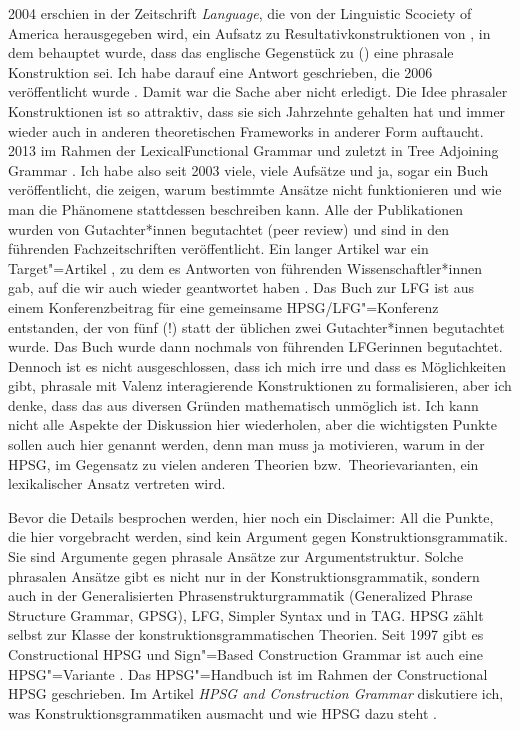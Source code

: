 2004 erschien in der Zeitschrift \emph{Language}, die von der Linguistic Scociety of America
herausgegeben wird, ein Aufsatz zu Resultativkonstruktionen von \citet{GJ2004a}, in dem behauptet
wurde, dass das englische Gegenstück zu () eine phrasale Konstruktion sei. Ich habe darauf
eine Antwort geschrieben, die 2006 veröffentlicht wurde \citep{Mueller2006d}. Damit war die Sache
aber nicht erledigt. Die Idee phrasaler Konstruktionen ist so attraktiv, dass sie sich Jahrzehnte
gehalten hat und immer wieder auch in anderen theoretischen Frameworks in anderer Form
auftaucht. 2013 im Rahmen der Lexical\indexlfg Functional Grammar \citep{Toivonen2013a,ADT2013a} und zuletzt in Tree Adjoining
Grammar \citep{KO2013a-u,LK2017a,Seyffarth2023a}. Ich habe also seit 2003 viele, viele Aufsätze und ja, sogar ein Buch veröffentlicht, die
zeigen, warum bestimmte Ansätze nicht funktionieren und wie man die Phänomene stattdessen
beschreiben kann. Alle der Publikationen wurden von Gutachter*innen begutachtet (peer
review) und sind in den führenden Fachzeitschriften veröffentlicht. Ein langer Artikel war ein
Target"=Artikel \citep{MWArgSt}, zu dem es Antworten von führenden Wissenschaftler*innen gab, auf die wir auch
wieder geantwortet haben \citep{MWArgStReply}. Das Buch zur LFG \citep{MuellerLFGphrasal} ist aus einem
Konferenzbeitrag für eine gemeinsame HPSG/LFG"=Konferenz \citep{MuellerHeadLex} entstanden, der von
fünf (!) statt der üblichen zwei Gutachter*innen begutachtet wurde. Das Buch wurde dann nochmals von
führenden LFGerinnen begutachtet. Dennoch ist es nicht ausgeschlossen, dass ich mich irre und dass
es Möglichkeiten gibt, phrasale mit Valenz interagierende Konstruktionen zu formalisieren, aber ich
denke, dass das aus diversen Gründen mathematisch unmöglich ist. Ich kann nicht alle Aspekte der Diskussion hier
wiederholen, aber die wichtigsten Punkte sollen auch hier genannt werden, denn man muss ja
motivieren, warum in der HPSG, im Gegensatz zu vielen anderen Theorien bzw.\ Theorievarianten, ein lexikalischer Ansatz
vertreten wird.

Bevor die Details besprochen werden, hier noch ein Disclaimer: All die Punkte, die hier vorgebracht
werden, sind kein Argument gegen Konstruktionsgrammatik. Sie sind Argumente gegen phrasale Ansätze
zur Argumentstruktur. Solche phrasalen Ansätze gibt es nicht nur in der Konstruktionsgrammatik,
sondern auch in der Generalisierten Phrasenstrukturgrammatik (Generalized Phrase Structure Grammar,
GPSG), LFG, Simpler Syntax und in TAG. HPSG zählt selbst zur Klasse der konstruktionsgrammatischen Theorien. Seit 1997 gibt
es Constructional HPSG \citep{Sag97a} und Sign"=Based Construction Grammar ist auch eine 
HPSG"=Variante \citep[]{Sag2010b}. Das HPSG"=Handbuch \citep*{HPSGHandbook} ist im Rahmen der Constructional HPSG
geschrieben. Im Artikel \emph{HPSG and Construction Grammar} diskutiere ich, was 
Konstruktionsgrammatiken ausmacht und wie HPSG dazu steht \citep{MuellerCxG}.


